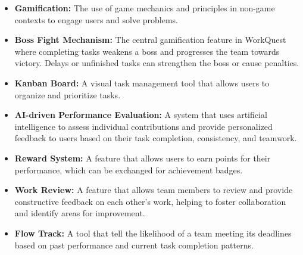 \begin{itemize}  
    \item \textbf{Gamification:} The use of game mechanics and principles in non-game contexts to engage users and solve problems.  
    \item \textbf{Boss Fight Mechanism:} The central gamification feature in WorkQuest where completing tasks weakens a boss and progresses the team towards victory. Delays or unfinished tasks can strengthen the boss or cause penalties.  
    \item \textbf{Kanban Board:} A visual task management tool that allows users to organize and prioritize tasks.
    \item \textbf{AI-driven Performance Evaluation:} A system that uses artificial intelligence to assess individual contributions and provide personalized feedback to users based on their task completion, consistency, and teamwork.  
    \item \textbf{Reward System:} A feature that allows users to earn points for their performance, which can be exchanged for achievement badges.
    \item \textbf{Work Review:} A feature that allows team members to review and provide constructive feedback on each other’s work, helping to foster collaboration and identify areas for improvement.  
    \item \textbf{Flow Track:} A tool that tell the likelihood of a team meeting its deadlines based on past performance and current task completion patterns.  
\end{itemize}  
